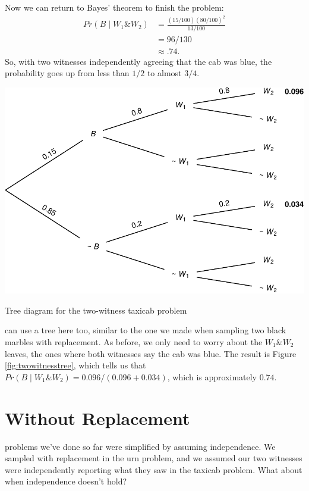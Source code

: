 \documentclass[justified]{tufte-book}
\newcommand{\given}{\mid}
\renewcommand{\wedge}{\mathbin{\&}}
\newcommand{\p}{Pr}
\theoremstyle{definition}
\theoremstyle{definition}
\theoremstyle{definition}
\theoremstyle{remark}
\begin{document}
Now we can return to Bayes' theorem to finish the problem:
\[
  \begin{aligned}
    \p(B \given W_1 \wedge W_2) &= \frac{(15/100)(80/100)^2}{13/100}\\
                                &= 96/130\\
                                &\approx .74.
  \end{aligned}
\]
So, with two witnesses independently agreeing that the cab was blue, the probability goes up from less than \(1/2\) to almost \(3/4\).

\begin{marginfigure}
\includegraphics{_main_files/figure-latex/twowitnesstree-1} \caption[Tree diagram for the two-witness taxicab problem]{Tree diagram for the two-witness taxicab problem}\label{fig:twowitnesstree}
\end{marginfigure}

 can use a tree here too, similar to the one we made when sampling two black marbles with replacement. As before, we only need to worry about the \(W_1 \wedge W_2\) leaves, the ones where both witnesses say the cab was blue. The result is Figure \ref{fig:twowitnesstree}, which tells us that \(\p(B \given W_1 \wedge W_2) = 0.096 / (0.096 + 0.034)\), which is approximately \(0.74\).

\hypertarget{without-replacement}{%
\section{Without Replacement}\label{without-replacement}}

 problems we've done so far were simplified by assuming independence. We sampled with replacement in the urn problem, and we assumed our two witnesses were independently reporting what they saw in the taxicab problem. What about when independence doesn't hold?
\end{document}
